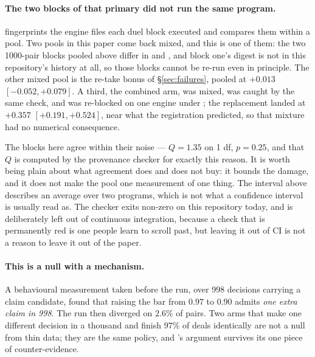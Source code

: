 \documentclass[11pt,letterpaper]{article}
\begin{document}
\paragraph{The two blocks of that primary did not run the same program.}
 fingerprints the engine files each
duel block executed and compares them within a pool. Two pools in this paper
come back mixed, and this is one of them: the two 1000-pair blocks pooled above
differ in  and , and block
one's  digest is not in this repository's history at all, so
those blocks cannot be re-run even in principle. The other mixed pool is the
re-take bonus of \S\ref{sec:failures}, pooled at $+0.013$ $[-0.052, +0.079]$.
A third, the combined arm, was mixed, was caught by the same check, and was
re-blocked on one engine under
; the replacement landed at
$+0.357$ $[+0.191, +0.524]$, near what the registration predicted, so that
mixture had no numerical consequence.

The blocks here agree within their noise --- $Q = 1.35$ on 1 df, $p = 0.25$,
and that $Q$ is computed by the provenance checker for exactly this reason. It
is worth being plain about what agreement does and does not buy: it bounds the
damage, and it does not make the pool one measurement of one thing. The
interval above describes an average over two programs, which is not what a
confidence interval is usually read as. The checker exits non-zero on this
repository today, and is deliberately left out of continuous integration,
because a check that is permanently red is one people learn to scroll past,
but leaving it out of CI is not a reason to leave it out of the paper.

\paragraph{This is a null with a mechanism.} A behavioural measurement taken
before the run, over $998$ decisions carrying a claim candidate, found that
raising the bar from $0.97$ to $0.90$ admits \emph{one extra claim in 998}. The
run then diverged on $2.6\%$ of pairs. Two arms that make one different decision
in a thousand and finish $97\%$ of deals identically are not a null from thin
data; they are the same policy, and 's argument survives its
one piece of counter-evidence.
\end{document}
